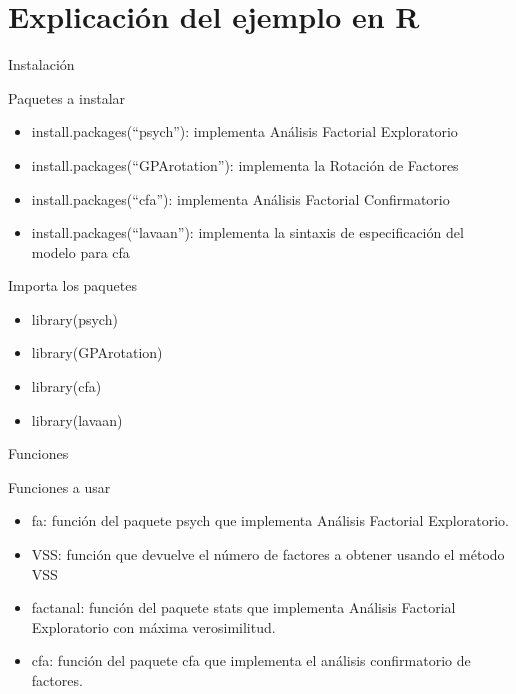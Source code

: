 \documentclass[10pt]{beamer}
\begin{document}
\section{Explicación del ejemplo en R}

\begin{frame}[fragile]{Instalación}
	\vspace{10px}
	\begin{block}{Paquetes a instalar}
		\begin{itemize}
			\item install.packages(``psych''): implementa Análisis Factorial Exploratorio
			\item install.packages(``GPArotation''): implementa la Rotación de Factores
			\item install.packages(``cfa''): implementa Análisis Factorial Confirmatorio
			\item install.packages(``lavaan''): implementa la sintaxis de especificación del modelo para cfa
		\end{itemize}
	\end{block}
	\vspace{10px}
	\begin{alertblock}{Importa los paquetes}
		\begin{itemize}
			\item library(psych)
			\item library(GPArotation)
			\item library(cfa)
			\item library(lavaan)
		\end{itemize}
	\end{alertblock}
\end{frame}

\begin{frame}[fragile]{Funciones}
\vspace{10px}
\begin{block}{Funciones a usar}
	\begin{itemize}
		\item fa: función del paquete psych que implementa Análisis Factorial Exploratorio.
		\item VSS: función que devuelve el número de factores a obtener usando el método VSS
		\item factanal: función del paquete stats que implementa Análisis Factorial Exploratorio con máxima verosimilitud.
		\item cfa: función del paquete cfa que implementa el análisis confirmatorio de factores.
	\end{itemize}
\end{block}
\end{frame}
\end{document}
